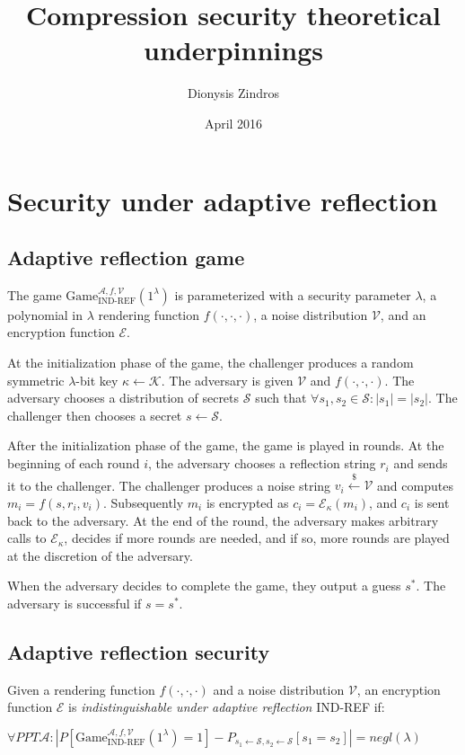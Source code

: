 \documentclass{article}
\title{Compression security theoretical underpinnings}
\author{Dionysis Zindros}
\date{April 2016}
\begin{document}
\maketitle

\section*{Security under adaptive reflection}

\subsection*{Adaptive reflection game}

The game $\text{Game}_{\text{IND-REF}}^{\mathcal{A}, f,
\mathcal{V}}(1^\lambda)$ is parameterized with a security parameter $\lambda$,
a polynomial in $\lambda$ rendering function $f(\cdot, \cdot, \cdot)$, a noise
distribution $\mathcal{V}$, and an encryption function $\mathcal{E}$.

At the initialization phase of the game, the challenger produces a random
symmetric $\lambda$-bit key $\kappa \leftarrow \mathcal{K}$. The adversary is
given $\mathcal{V}$ and $f(\cdot, \cdot, \cdot)$.  The adversary chooses a
distribution of secrets $\mathcal{S}$ such that $\forall s_1, s_2 \in
\mathcal{S}: |s_1| = |s_2|$.  The challenger then chooses a secret $s
\leftarrow \mathcal{S}$.

After the initialization phase of the game, the game is played in rounds. At
the beginning of each round $i$, the adversary chooses a reflection string
$r_i$ and sends it to the challenger. The challenger produces a noise string
$v_i \xleftarrow{\$} \mathcal{V}$ and computes $m_i = f(s, r_i, v_i)$.
Subsequently $m_i$ is encrypted as $c_i = \mathcal{E}_\kappa(m_i)$, and $c_i$
is sent back to the adversary. At the end of the round, the adversary makes
arbitrary calls to $\mathcal{E}_\kappa$, decides if more rounds are needed, and
if so, more rounds are played at the discretion of the adversary.

When the adversary decides to complete the game, they output a guess $s^*$. The
adversary is successful if $s = s^*$.

\subsection*{Adaptive reflection security}

Given a rendering function $f(\cdot, \cdot, \cdot)$ and a noise distribution
$\mathcal{V}$, an encryption function $\mathcal{E}$ is
\textit{indistinguishable under adaptive reflection} IND-REF if:

$\forall PPT \mathcal{A}: |P[\text{Game}_{\text{IND-REF}}^{\mathcal{A}, f,
\mathcal{V}}(1^\lambda) = 1] - P_{s_1 \leftarrow \mathcal{S}, s_2 \leftarrow
\mathcal{S}}[s_1 = s_2]| = negl(\lambda)$
\end{document}
